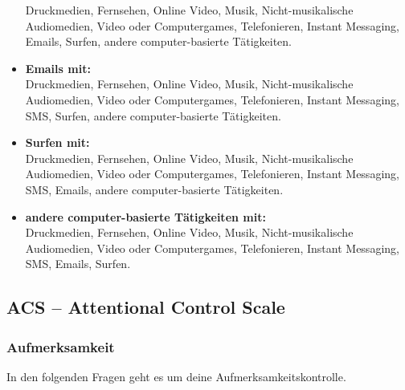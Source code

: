 \begin{itemize}
Druckmedien, Fernsehen, Online Video, Musik, Nicht-musikalische Audiomedien, Video oder Computergames, Telefonieren, Instant Messaging, Emails, Surfen, andere computer-basierte Tätigkeiten. 
        \item \textbf{Emails mit:}\\
Druckmedien, Fernsehen, Online Video, Musik, Nicht-musikalische Audiomedien, Video oder Computergames, Telefonieren, Instant Messaging, SMS, Surfen, andere computer-basierte Tätigkeiten. 
        \item \textbf{Surfen mit:}\\
Druckmedien, Fernsehen, Online Video, Musik, Nicht-musikalische Audiomedien, Video oder Computergames, Telefonieren, Instant Messaging, SMS, Emails, andere computer-basierte Tätigkeiten.
        \item \textbf{andere computer-basierte Tätigkeiten mit:}\\
Druckmedien, Fernsehen, Online Video, Musik, Nicht-musikalische Audiomedien, Video oder Computergames, Telefonieren, Instant Messaging, SMS, Emails, Surfen.        
    \end{itemize}
\subsection{ACS -- Attentional Control Scale}\label{anhangSection.macs}   
\subsubsection{Aufmerksamkeit}  
In den folgenden Fragen geht es um deine Aufmerksamkeitskontrolle.
